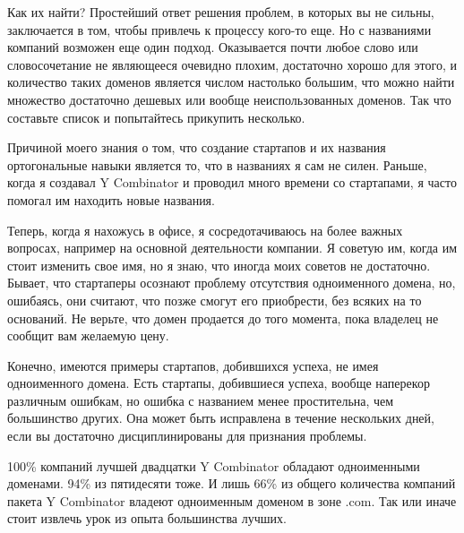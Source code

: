 \documentclass[ebook,12pt,oneside,openany]{memoir}
\begin{document}
Как их найти? Простейший ответ решения проблем, в которых вы не
сильны, заключается в том, чтобы привлечь к процессу кого-то еще. Но с
названиями компаний возможен еще один подход. Оказывается почти любое
слово или словосочетание не являющееся очевидно плохим, достаточно
хорошо для этого, и количество таких доменов является числом настолько
большим, что можно найти множество достаточно дешевых или вообще
неиспользованных доменов. Так что составьте список и попытайтесь
прикупить несколько.

Причиной моего знания о том, что создание стартапов и их названия
ортогональные навыки является то, что в названиях я сам не силен.
Раньше, когда я создавал Y Combinator и проводил много времени со
стартапами, я часто помогал им находить новые названия.

Теперь, когда я нахожусь в офисе, я сосредотачиваюсь на более важных
вопросах, например на основной деятельности компании. Я советую им,
когда им стоит изменить свое имя, но я знаю, что иногда моих советов
не достаточно. Бывает, что стартаперы осознают проблему отсутствия
одноименного домена, но, ошибаясь, они считают, что позже смогут его
приобрести, без всяких на то оснований. Не верьте, что домен продается
до того момента, пока владелец не сообщит вам желаемую цену.

Конечно, имеются примеры стартапов, добившихся успеха, не имея
одноименного домена. Есть стартапы, добившиеся успеха, вообще
наперекор различным ошибкам, но ошибка с названием менее простительна,
чем большинство других. Она может быть исправлена в течение нескольких
дней, если вы достаточно дисциплинированы для признания проблемы.

100\% компаний лучшей двадцатки Y Combinator обладают одноименными
доменами. 94\% из пятидесяти тоже. И лишь 66\% из общего количества
компаний пакета Y Combinator владеют одноименным доменом в зоне .com.
Так или иначе стоит извлечь урок из опыта большинства лучших.
\end{document}
